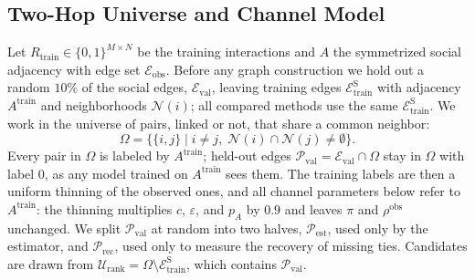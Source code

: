 \documentclass[sigconf]{acmart}
\begin{document}
\subsection{Two-Hop Universe and Channel Model}
\label{sec:universe}
Let $R_{\text{train}} \in \{0,1\}^{M \times N}$ be the training interactions and $A$ the symmetrized social adjacency with edge set $\mathcal{E}_{\text{obs}}$. Before any graph construction we hold out a random $10\%$ of the social edges, $\mathcal{E}_{\text{val}}$, leaving training edges $\mathcal{E}_{\text{train}}^{\text{S}}$ with adjacency $A^{\text{train}}$ and neighborhoods $\mathcal{N}(i)$; all compared methods use the same $\mathcal{E}_{\text{train}}^{\text{S}}$. We work in the universe of pairs, linked or not, that share a common neighbor:
\begin{equation}
    \Omega = \big\{\{i,j\} \;\big|\; i \neq j, \; \mathcal{N}(i) \cap \mathcal{N}(j) \neq \emptyset\big\}. \label{eq:omega_def}
\end{equation}
Every pair in $\Omega$ is labeled by $A^{\text{train}}$; held-out edges $\mathcal{P}_{\text{val}} = \mathcal{E}_{\text{val}} \cap \Omega$ stay in $\Omega$ with label $0$, as any model trained on $A^{\text{train}}$ sees them. The training labels are then a uniform thinning of the observed ones, and all channel parameters below refer to $A^{\text{train}}$: the thinning multiplies $c$, $\varepsilon$, and $p_A$ by $0.9$ and leaves $\pi$ and $\rho^{\text{obs}}$ unchanged. We split $\mathcal{P}_{\text{val}}$ at random into two halves, $\mathcal{P}_{\text{est}}$, used only by the estimator, and $\mathcal{P}_{\text{rec}}$, used only to measure the recovery of missing ties. Candidates are drawn from $\mathcal{U}_{\text{rank}} = \Omega \setminus \mathcal{E}_{\text{train}}^{\text{S}}$, which contains $\mathcal{P}_{\text{val}}$.
\end{document}
